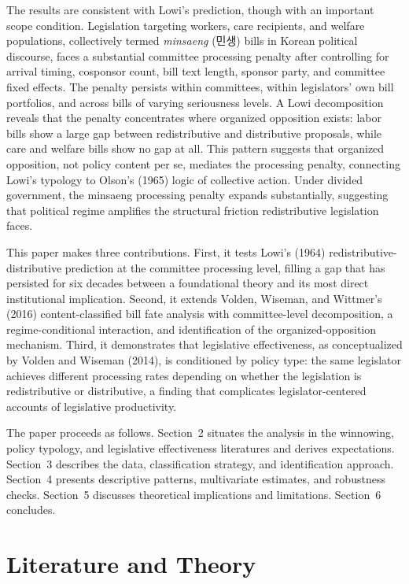 \documentclass[11pt]{article}
\begin{document}
The results are consistent with Lowi's prediction, though with an important scope condition. Legislation targeting workers, care recipients, and welfare populations, collectively termed \textit{minsaeng} (민생) bills in Korean political discourse, faces a substantial committee processing penalty after controlling for arrival timing, cosponsor count, bill text length, sponsor party, and committee fixed effects. The penalty persists within committees, within legislators' own bill portfolios, and across bills of varying seriousness levels. A Lowi decomposition reveals that the penalty concentrates where organized opposition exists: labor bills show a large gap between redistributive and distributive proposals, while care and welfare bills show no gap at all. This pattern suggests that organized opposition, not policy content per se, mediates the processing penalty, connecting Lowi's typology to Olson's (1965) logic of collective action. Under divided government, the minsaeng processing penalty expands substantially, suggesting that political regime amplifies the structural friction redistributive legislation faces.

This paper makes three contributions. First, it tests Lowi's (1964) redistributive-distributive prediction at the committee processing level, filling a gap that has persisted for six decades between a foundational theory and its most direct institutional implication. Second, it extends Volden, Wiseman, and Wittmer's (2016) content-classified bill fate analysis with committee-level decomposition, a regime-conditional interaction, and identification of the organized-opposition mechanism. Third, it demonstrates that legislative effectiveness, as conceptualized by Volden and Wiseman (2014), is conditioned by policy type: the same legislator achieves different processing rates depending on whether the legislation is redistributive or distributive, a finding that complicates legislator-centered accounts of legislative productivity.

The paper proceeds as follows. Section~2 situates the analysis in the winnowing, policy typology, and legislative effectiveness literatures and derives expectations. Section~3 describes the data, classification strategy, and identification approach. Section~4 presents descriptive patterns, multivariate estimates, and robustness checks. Section~5 discusses theoretical implications and limitations. Section~6 concludes.


\section{Literature and Theory}
\end{document}

